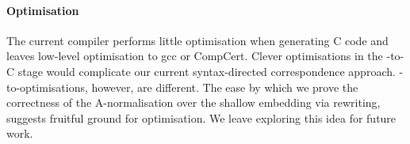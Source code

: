 \documentclass[9pt\ifFinal\else,preprint,nocopyrightspace\fi,\ifAlpha\else natbib,authoryear\fi]{sigplanconf}
\begin{document}
\paragraph{Optimisation}

The current \CDSL compiler performs little optimisation when generating C
code and leaves low-level optimisation to gcc or CompCert. Clever
optimisations in the \cdsl-to-C stage would complicate our current
syntax-directed correspondence approach. \CDSL-to-\CDSL optimisations,
however, are different. The ease by which we prove the correctness of the
A-normalisation over the shallow embedding via rewriting, suggests fruitful
ground for optimisation. We leave exploring this idea for future work.






































































\newcommand{\totalEffort}{$\approx 5$ person-years\xspace}

\newcommand{\compilerEffort}{$\approx 10$ person-months\xspace}

\newcommand{\certcompEffort}{$\approx 33.5$ person-months\xspace}

\newcommand{\langproofEffort}{$\approx 18$ person-months\xspace}
\end{document}
